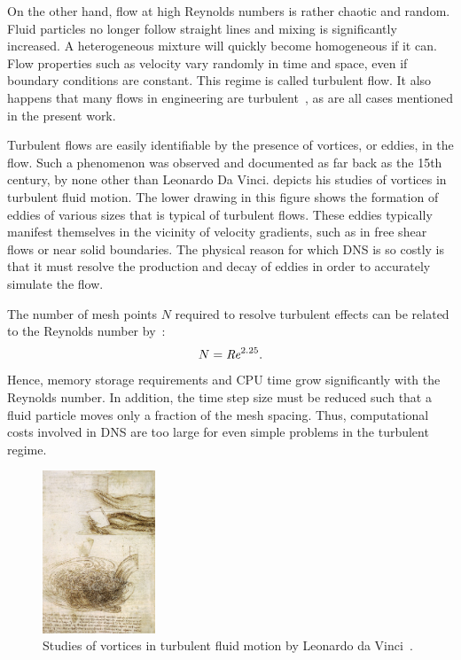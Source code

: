 On the other hand, flow at high Reynolds numbers is rather chaotic and random. Fluid particles no longer follow straight lines and mixing is significantly increased. A heterogeneous mixture will quickly become homogeneous if it can. Flow properties such as velocity vary randomly in time and space, even if boundary conditions are constant. This regime is called turbulent flow. It also happens that many flows in engineering are turbulent~\cite{versteeg2007introduction}, as are all cases mentioned in the present work.

Turbulent flows are easily identifiable by the presence of vortices, or eddies, in the flow. Such a phenomenon was observed and documented as far back as the 15th century, by none other than Leonardo Da Vinci.  depicts his studies of vortices in turbulent fluid motion. The lower drawing in this figure shows the formation of eddies of various sizes that is typical of turbulent flows. These eddies typically manifest themselves in the vicinity of velocity gradients, such as in free shear flows or near solid boundaries. The physical reason for which DNS is so costly is that it must resolve the production and decay of eddies in order to accurately simulate the flow.

The number of mesh points $N$ required to resolve turbulent effects can be related to the Reynolds number by~\cite{wilcox1998turbulence}:
\begin{equation*}
    N = \mbox{\textit{Re}}^{2.25}.
\end{equation*}
Hence, memory storage requirements and CPU time grow significantly with the Reynolds number. In addition, the time step size must be reduced such that a fluid particle moves only a fraction of the mesh spacing. Thus, computational costs involved in DNS are too large for even simple problems in the turbulent regime.

\begin{figure}
    \centering
    \includegraphics[width=0.3\textwidth]{figs/vinci}
    \caption{Studies of vortices in turbulent fluid motion by Leonardo da Vinci~\cite{wiki:vinci}.}
    \label{fig:vinci}
\end{figure}

